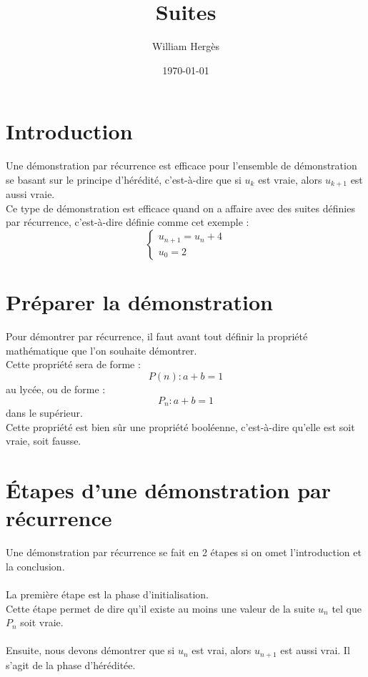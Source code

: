 \documentclass{article}
\title{Suites}
\author{William Hergès}
\date{\today}
\begin{document}
	\maketitle

	\section{Introduction}

	Une démonstration par récurrence est efficace pour l'ensemble de démonstration se basant sur le principe d'hérédité, c'est-à-dire que si $u_k$ est vraie, alors $u_{k+1}$ est aussi vraie. \\
	Ce type de démonstration est efficace quand on a affaire avec des suites définies par récurrence, c'est-à-dire définie comme cet exemple :
	\[ \left\{ \begin{array}{l}
			u_{n+1} = u_n+4 \\
			u_0 = 2
        	\end{array}
		\right.  \]

	\section{Préparer la démonstration}

	Pour démontrer par récurrence, il faut avant tout définir la propriété mathématique que l'on souhaite démontrer. \\
	Cette propriété sera de forme :
	\[ P(n): a+b = 1 \]
	au lycée, ou de forme :
	\[ P_n: a+b = 1 \]
	dans le supérieur. \\
	Cette propriété est bien sûr une propriété booléenne, c'est-à-dire qu'elle est soit vraie, soit fausse.

	\section{Étapes d'une démonstration par récurrence}

	Une démonstration par récurrence se fait en 2 étapes si on omet l'introduction et la conclusion. \\
	\\
	La première étape est la phase d'initialisation. \\
	Cette étape permet de dire qu'il existe au moins une valeur de la suite $u_n$ tel que $P_n$ soit vraie.\\
	\\
	Ensuite, nous devons démontrer que si $u_n$ est vrai, alors $u_{n+1}$ est aussi vrai. Il s'agit de la phase d'héréditée.
\end{document}
